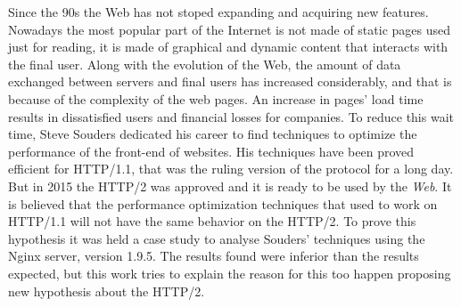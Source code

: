 %
%

\begin{resumo}[Abstract]

Since the 90s the Web has not stoped expanding and acquiring new features. Nowadays the most popular part of the Internet is not made of static pages used just for reading, it is made of graphical and dynamic content that interacts with the final user. Along with the evolution of the Web, the amount of data exchanged between servers and final users has increased considerably, and that is because of the complexity of the web pages. An increase in pages' load time results in dissatisfied users and financial losses for companies. To reduce this wait time, Steve Souders dedicated his career to find techniques to optimize the performance of the front-end of websites. His techniques have been proved efficient for HTTP/1.1, that was the ruling version of the protocol for a long day. But in 2015 the HTTP/2 was approved and it is ready to be used by the \textit{Web}. It is believed that the performance optimization techniques that used to work on HTTP/1.1 will not have the same behavior on the HTTP/2. To prove this hypothesis it was held a case study to analyse Souders' techniques using the Nginx server, version 1.9.5. The results found were inferior than the results expected, but this work tries to explain the reason for this too happen proposing new hypothesis about the HTTP/2.

\end{resumo}
